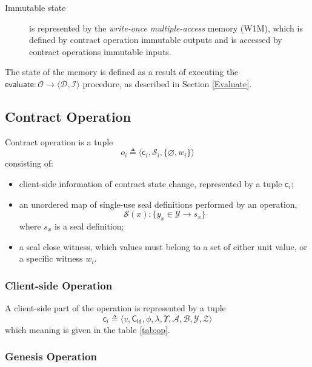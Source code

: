 \documentclass[9pt,oneside]{amsart}
\begin{document}
\begin{multicols}{2}
\begin{description}
\item[Immutable state] is represented by the \emph{write-once multiple-access} memory (W1M),
  which is defined by contract operation immutable outputs
  and is accessed by contract operations immutable inputs.
\end{description}

The state of the memory is defined as a result of executing the
$\mathsf{evaluate}: \mathcal{O} \rightarrow \langle \mathcal{D}, \mathcal{I} \rangle$ procedure,
as described in Section \ref{Evaluate}.

\subsection{Contract Operation}\label{Operation}

Contract operation is a tuple
\begin{equation}\label{eq:op}
o_i \triangleq \big\langle \mathsf{c}_i, \mathcal{S}_i, \{ \varnothing, w_i \} \big\rangle
\end{equation}
\noindent
consisting of:
\noindent
\begin{itemize}
\item client-side information of contract state change, represented by a tuple $\mathsf{c}_i$;
\item an unordered map of single-use seal definitions performed by an operation,
\noindent
\begin{equation}\label{eq:seals}
  \mathcal{S}(x): \{ y_x \in \mathcal{Y} \rightarrow s_x \}
  \end{equation}
\noindent
where $s_x$ is a seal definition;
\item a seal close witness,
which values must belong to a set of either unit value, or a specific witness $w_i$.
\end{itemize}

\subsubsection{Client-side Operation}

A client-side part of the operation is represented by a tuple
\noindent
\begin{equation}
\mathsf{c}_i \triangleq \langle v, \mathsf{C_{Id}}, \phi, \lambda, \Upsilon, \mathcal{A}, \mathcal{B}, \mathcal{Y}, \mathcal{Z} \rangle
\end{equation}
\noindent
which meaning is given in the table \ref{tab:op}.

\subsubsection{Genesis Operation}


\end{multicols}
\end{document}

